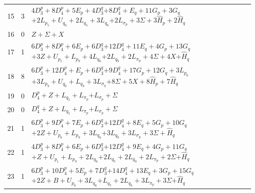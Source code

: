\documentclass[11pt,a4paper]{article}
\theoremstyle{remark}
\begin{document}
\begin{longtable}{rrp{12.7cm}}
15&3&\( 4D_3^p + 8D_4^p + 5E_p + 4D_3^q \)\newline\( + 8D_4^q + E_q + 11G_p + 3G_q \)\newline\( + 2L_{p_{5}} + U_{q_{0}} + 2L_{q_{5}} + 3L_{q_{8}} \)\newline\( + 2L_{\sigma_p} + 3\Sigma + 3\widehat H_p + 2\widehat H_q \)\\[3pt]
16&0&\( Z + \Sigma + X \)\\[3pt]
17&1&\( 6D_3^p + 8D_4^p + 6E_p + 6D_3^q \)\newline\( + 12D_4^q + 11E_q + 4G_p + 13G_q \)\newline\( + 3Z + U_{p_{1}} + L_{p_{9}} + 4L_{q_{6}} \)\newline\( + 2L_{q_{9}} + 2L_{\pi_p} + 4\Sigma + 4X \)\newline\( + \widehat H_q \)\\[3pt]
18&8&\( 6D_3^p + 12D_4^p + E_p + 6D_3^q \)\newline\( + 9D_4^q + 17G_p + 12G_q + 3L_{p_{6}} \)\newline\( + 3L_{p_{9}} + U_{q_{0}} + L_{q_{9}} + 3L_{\sigma_q} \)\newline\( + 8\Sigma + 5X + 8\widehat H_p + 7\widehat H_q \)\\[3pt]
19&0&\( D_4^p + Z + L_{q_{5}} + L_{\pi_p} \)\newline\( + L_{\sigma_p} + \Sigma \)\\[3pt]
20&0&\( D_4^q + Z + L_{q_{5}} + L_{\pi_p} \)\newline\( + L_{\sigma_p} + \Sigma \)\\[3pt]
21&1&\( 6D_3^p + 9D_4^p + 7E_p + 6D_3^q \)\newline\( + 12D_4^q + 8E_q + 5G_p + 10G_q \)\newline\( + 2Z + U_{p_{0}} + L_{p_{9}} + 3L_{q_{6}} \)\newline\( + 3L_{q_{9}} + 3L_{\sigma_p} + 3\Sigma + \widehat H_q \)\\[3pt]
22&1&\( 4D_3^p + 8D_4^p + 6E_p + 6D_3^q \)\newline\( + 12D_4^q + 9E_q + 4G_p + 11G_q \)\newline\( + Z + U_{p_{1}} + L_{p_{9}} + 2L_{q_{6}} \)\newline\( + 2L_{q_{7}} + 2L_{q_{9}} + 2L_{\pi_p} + 2\Sigma \)\newline\( + \widehat H_q \)\\[3pt]
23&1&\( 6D_3^p + 10D_4^p + 5E_p + 7D_3^q \)\newline\( + 14D_4^q + 13E_q + 3G_p + 15G_q \)\newline\( + 2Z + B + U_{p_{0}} + 3L_{q_{6}} \)\newline\( + L_{q_{7}} + 2L_{q_{8}} + 3L_{\pi_p} + 3\Sigma \)\newline\( + \widehat H_q \)\\[3pt]

\end{longtable}
\end{document}
